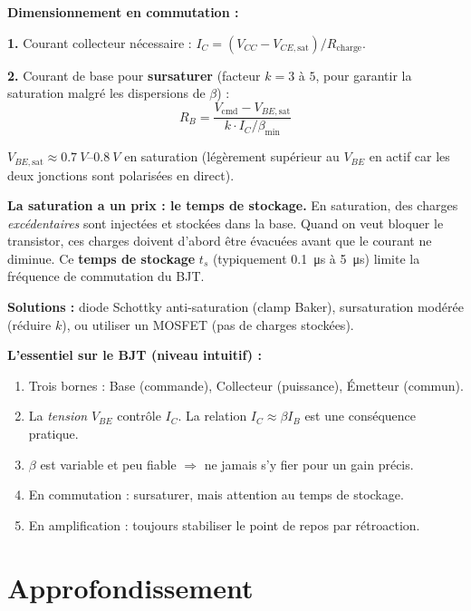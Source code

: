 \documentclass[12pt,a4paper,twoside]{book}
\begin{document}
\begin{formule}
\textbf{Dimensionnement en commutation :}

\textbf{1.} Courant collecteur nécessaire : $I_C = (V_{CC} - V_{CE,\text{sat}})/R_{\text{charge}}$.

\textbf{2.} Courant de base pour \textbf{sursaturer} (facteur $k = 3$ à $5$, pour garantir la saturation malgré les dispersions de $\beta$) :
\[
\boxed{R_B = \frac{V_{\text{cmd}} - V_{BE,\text{sat}}}{k \cdot I_C / \beta_{\min}}}
\]

$V_{BE,\text{sat}} \approx \SI{0.7}{V}$--$\SI{0.8}{V}$ en saturation (légèrement supérieur au $V_{BE}$ en actif car les deux jonctions sont polarisées en direct).
\end{formule}

\begin{attention}
\textbf{La saturation a un prix : le temps de stockage.} En saturation, des charges \textit{excédentaires} sont injectées et stockées dans la base. Quand on veut bloquer le transistor, ces charges doivent d'abord être évacuées avant que le courant ne diminue. Ce \textbf{temps de stockage} $t_s$ (typiquement \SI{0.1}{\micro s} à \SI{5}{\micro s}) limite la fréquence de commutation du BJT.

\textbf{Solutions :} diode Schottky anti-saturation (clamp Baker), sursaturation modérée (réduire $k$), ou utiliser un MOSFET (pas de charges stockées).
\end{attention}

\begin{retenir}
\textbf{L'essentiel sur le BJT (niveau intuitif) :}
\begin{enumerate}[nosep]
\item Trois bornes : Base (commande), Collecteur (puissance), Émetteur (commun).
\item La \textit{tension} $V_{BE}$ contrôle $I_C$. La relation $I_C \approx \beta I_B$ est une conséquence pratique.
\item $\beta$ est variable et peu fiable $\Rightarrow$ ne jamais s'y fier pour un gain précis.
\item En commutation : sursaturer, mais attention au temps de stockage.
\item En amplification : toujours stabiliser le point de repos par rétroaction.
\end{enumerate}
\end{retenir}

\section{Approfondissement}
\end{document}
